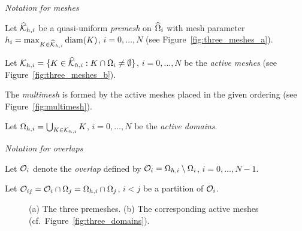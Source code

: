 \documentclass[graybox]{svmult}
\begin{document}
\begin{mytcolorbox}
\emph{Notation for meshes}
\tcblower

Let $\widehat{\mathcal{K}}_{h,i}$ be a quasi-uniform \cite{BreSco08} \emph{premesh} on $\widehat{\Omega}_i$ with mesh parameter $h_i = \max_{K\in \widehat{\mathcal{K}}_{h,i}} \operatorname*{diam}(K)$, $i=0,\ldots,N$ (see Figure~\ref{fig:three_meshes_a}).

Let $\mathcal{K}_{h,i} = \{ K \in \widehat{\mathcal{K}}_{h,i} : K \cap \Omega_i \neq \emptyset \}$, $i=0,\ldots,N$ be the \emph{active meshes} (see Figure~\ref{fig:three_meshes_b}).

The \emph{multimesh} is formed by the active meshes placed in the given ordering (see Figure~\ref{fig:multimesh}).

Let $\Omega_{h,i} = \bigcup_{K\in\mathcal{K}_{h,i}} K$, $i=0,\ldots,N$ be the \emph{active domains}.
\end{mytcolorbox}

\begin{mytcolorbox}
\emph{Notation for overlaps}
\tcblower

Let $\mathcal{O}_i$ denote the \emph{overlap} defined by  $\mathcal{O}_i = \Omega_{h,i} \setminus \Omega_i$, $i=0,\ldots,N-1$.

Let $\mathcal{O}_{ij} = \mathcal{O}_i \cap \Omega_j = \Omega_{h,i} \cap \Omega_j$, $i < j$ be a partition of $\mathcal{O}_i$.


\end{mytcolorbox}

\begin{figure}
  \centering
  \qquad\qquad\qquad
  \caption{(a) The three premeshes. (b) The corresponding active meshes (cf.\ Figure~\ref{fig:three_domains}).}
\end{figure}
\end{document}
